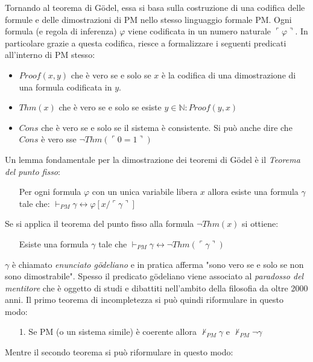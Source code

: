 \documentclass[./main.tex]{subfiles}
\begin{document}
Tornando al teorema di Gödel, essa si basa sulla costruzione di una codifica delle formule e delle dimostrazioni
di PM nello stesso linguaggio formale PM. 
Ogni formula (e regola di inferenza) $\varphi$ viene codificata in un numero naturale $\ulcorner  \varphi \urcorner $.
In particolare grazie a questa codifica, riesce a formalizzare i seguenti predicati all'interno di PM stesso:
\begin{itemize}
  \item $Proof(x, y)$ che è vero se e solo se $x$ è la codifica di una dimostrazione di una formula codificata in $y$.
  \item $Thm(x)$ che è vero se e solo se esiste $y\in \mathbb{N} : Proof(y, x)$
  \item $Cons$ che è vero se e solo se il sistema è consistente. Si può anche dire che $Cons$ è vero sse $\lnot Thm(\ulcorner 0 = 1 \urcorner)$
\end{itemize}

Un lemma fondamentale per la dimostrazione dei teoremi di Gödel è il \textit{Teorema del punto fisso}:
\begin{enumerate}
  \item[] Per ogni formula $\varphi$ con un unica variabile libera $x$ allora esiste una formula $\gamma$ tale che:
  $\vdash_{PM} \gamma \leftrightarrow \varphi[x/\ulcorner \gamma \urcorner]$
\end{enumerate}

Se si applica il teorema del punto fisso alla formula $\lnot Thm(x)$ si ottiene:
\begin{enumerate}
  \item[] Esiste una formula $\gamma$ tale che $\vdash_{PM} \gamma \leftrightarrow \lnot Thm(\ulcorner \gamma \urcorner)$
\end{enumerate}

$\gamma$ è chiamato \textit{enunciato gödeliano} e in pratica afferma "sono vero se e solo se non sono dimostrabile".
Spesso il predicato gödeliano viene associato al \textit{paradosso del mentitore} che è oggetto 
di studi e dibattiti nell'ambito della filosofia da oltre 2000 anni.
Il primo teorema di incompletezza si può quindi riformulare in questo modo:
\begin{enumerate}
  \item[1.] Se PM (o un sistema simile) è coerente allora $\nvdash_{PM} \gamma$ e $\nvdash_{PM} \lnot\gamma$
\end{enumerate}

Mentre il secondo teorema si può riformulare in questo modo:
\end{document}
